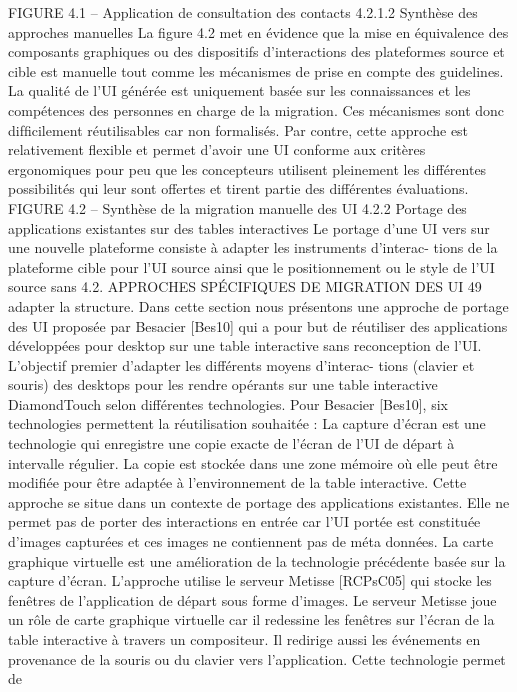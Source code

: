 \documentclass{article}
\begin{document}
FIGURE 4.1 – Application de consultation des contacts
4.2.1.2
Synthèse des approches manuelles
La ﬁgure 4.2 met en évidence que la mise en équivalence des composants graphiques ou des
dispositifs d’interactions des plateformes source et cible est manuelle tout comme les mécanismes de
prise en compte des guidelines. La qualité de l’UI générée est uniquement basée sur les connaissances
et les compétences des personnes en charge de la migration. Ces mécanismes sont donc difﬁcilement
réutilisables car non formalisés. Par contre, cette approche est relativement ﬂexible et permet d’avoir
une UI conforme aux critères ergonomiques pour peu que les concepteurs utilisent pleinement les
différentes possibilités qui leur sont offertes et tirent partie des différentes évaluations.
FIGURE 4.2 – Synthèse de la migration manuelle des UI
4.2.2
Portage des applications existantes sur des tables interactives
Le portage d’une UI vers sur une nouvelle plateforme consiste à adapter les instruments d’interac-
tions de la plateforme cible pour l’UI source ainsi que le positionnement ou le style de l’UI source sans
4.2. APPROCHES SPÉCIFIQUES DE MIGRATION DES UI
49
adapter la structure. Dans cette section nous présentons une approche de portage des UI proposée par
Besacier [Bes10] qui a pour but de réutiliser des applications développées pour desktop sur une table
interactive sans reconception de l’UI. L’objectif premier d’adapter les différents moyens d’interac-
tions (clavier et souris) des desktops pour les rendre opérants sur une table interactive DiamondTouch
selon différentes technologies.
Pour Besacier [Bes10], six technologies permettent la réutilisation souhaitée :
La capture d’écran
est une technologie qui enregistre une copie exacte de l’écran de l’UI de départ
à intervalle régulier. La copie est stockée dans une zone mémoire où elle peut être modiﬁée pour être
adaptée à l’environnement de la table interactive. Cette approche se situe dans un contexte de portage
des applications existantes. Elle ne permet pas de porter des interactions en entrée car l’UI portée est
constituée d’images capturées et ces images ne contiennent pas de méta données.
La carte graphique virtuelle
est une amélioration de la technologie précédente basée sur la capture
d’écran. L’approche utilise le serveur Metisse [RCPsC05] qui stocke les fenêtres de l’application
de départ sous forme d’images. Le serveur Metisse joue un rôle de carte graphique virtuelle car il
redessine les fenêtres sur l’écran de la table interactive à travers un compositeur. Il redirige aussi les
événements en provenance de la souris ou du clavier vers l’application. Cette technologie permet de
\end{document}
